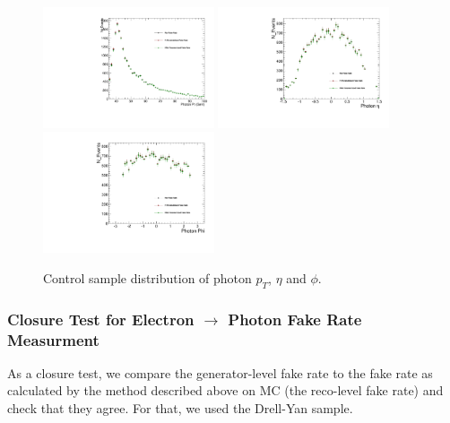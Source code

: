 \begin{figure}[H]
\begin{center}
  {\label{CS_params_pt}\includegraphics[width=0.45\textwidth]{efake_figs/CS_param_pt.pdf}}
  {\label{CS_params_eta}\includegraphics[width=0.45\textwidth]{efake_figs/CS_param_eta.pdf}}
\\
  {\label{CS_params_phi}\includegraphics[width=0.45\textwidth]{efake_figs/CS_param_phi.pdf}}
\caption{Control sample distribution of photon $p_T$, $\eta$ and $\phi$.}
\label{CS_params}
\end{center}
\end{figure}

\subsubsection{Closure Test for Electron $\rightarrow$ Photon Fake Rate Measurment}

As a closure test, we compare the generator-level fake rate to the fake rate as calculated by the method described above on MC (the reco-level fake rate) and check that they agree.
For that, we used the Drell-Yan sample.

